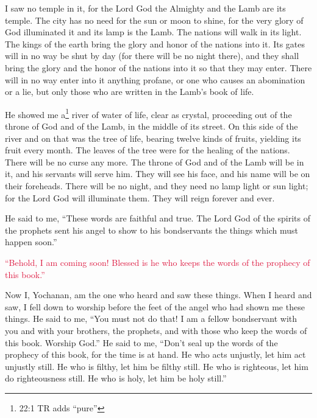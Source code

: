 \myverse{}I saw no temple in it, for the Lord God the Almighty and the
Lamb are its temple.
\myverse{}The city has no need for the sun or moon to shine, for the very glory of
God illuminated it and its lamp is the Lamb.
\myverse{}The nations will walk in its light. The kings of the earth bring the glory
and honor of the nations into it.
\myverse{}Its gates will in no way be shut by day (for there will be no night there),
\myverse{}and they shall bring the glory and the honor of the nations into it so that
they may enter.
\myverse{}There will in no way enter into it anything profane, or one who causes an
abomination or a lie, but only those who are written in the Lamb’s book of life.



\mychapter{} \myverse*{}He showed me a\footnote{22:1 TR adds “pure”} river of water of life, clear as crystal, proceeding out of the throne
of God and of the Lamb,
\myverse{}in the middle of its street. On this side of the river and on that was the
tree of life, bearing twelve kinds of fruits, yielding its fruit every month. The leaves of the tree were
for the healing of the nations.
\myverse{}There will be no curse any more. The throne of God and of the Lamb will be
in it, and his servants will serve him.
\myverse{}They will see his face, and his name will be on their foreheads.
\myverse{}There will be no night, and they need no lamp light or sun light; for the Lord
God will illuminate them. They will reign forever and ever.

\myverse{}He said to me, “These words are faithful and true. The Lord God
of the spirits of the prophets sent his angel to show to his bondservants the things which must happen
soon.”

\myverse{}\textcolor{crimson}{“Behold, I am coming soon! Blessed is he who keeps the words
	of the prophecy of this book.”}

\myverse{}Now I, Yochanan, am the one who heard and saw these things. When
I heard and saw, I fell down to worship before the feet of the angel who had shown me these things.
\myverse{}He said to me, “You must not do that! I am a fellow bondservant with you and
with your brothers, the prophets, and with those who keep the words of this book. Worship God.”
\myverse{}He said to me, “Don’t seal up the words of the prophecy of this book, for
the time is at hand.
\myverse{}He who acts unjustly, let him act unjustly still. He who is filthy, let him
be filthy still. He who is righteous, let him do righteousness still. He who is holy, let him be holy
still.”


